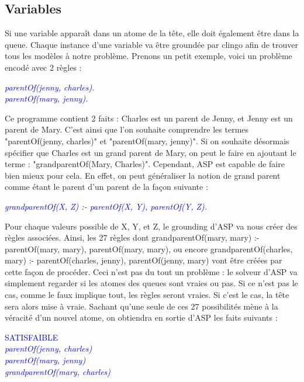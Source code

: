 \documentclass[12pt,a4paper]{article}
\begin{document}
\subsection{Variables}
Si une variable apparaît dans un atome de la tête, elle doit également être dans la queue. Chaque instance d'une variable va être groundée par clingo afin de trouver tous les modèles à notre problème.
Prenons un petit exemple, voici un problème encodé avec 2 règles :
\begin{center}
\emph{
	\textcolor{blue}{
  parentOf(jenny, charles).\\
  parentOf(mary, jenny).
	}
}
\end{center}
Ce programme contient 2 faits : Charles est un parent de Jenny, et Jenny est un parent de Mary. C'est ainsi que l'on souhaite comprendre les termes "parentOf(jenny, charles)" et "parentOf(mary, jenny)".
Si on souhaite désormais spécifier que Charles est un grand parent de Mary, on peut le faire en ajoutant le terme : "grandparentOf(Mary, Charles)". Cependant, ASP est capable de faire bien mieux pour cela.
En effet, on peut généraliser la notion de grand parent comme étant le parent d'un parent de la façon suivante :
\begin{center}
\emph{
	\textcolor{blue}{
  grandparentOf(X, Z) :- parentOf(X, Y), parentOf(Y, Z).
	}
}
\end{center}
Pour chaque valeurs possible de X, Y, et Z, le grounding d'ASP va nous créer des règles associées.
Ainsi, les 27 règles dont grandparentOf(mary, mary) :- parentOf(mary, mary), parentOf(mary, mary), ou encore grandparentOf(charles, mary) :- parentOf(charles, jenny), parentOf(jenny, mary) vont être créées 
par cette façon de procéder. Ceci n'est pas du tout un problème : le solveur d'ASP va simplement regarder si les atomes des queues sont vraies ou pas. Si ce n'est pas le cas, comme le faux implique tout, 
les règles seront vraies. Si c'est le cas, la tête sera alors mise à vraie. Sachant qu'une seule de ces 27 possibilités mène à la véracité d'un nouvel atome, on obtiendra en sortie d'ASP les faits suivants :
\begin{center}
\textcolor{blue}{
  SATISFAIBLE\\
	\emph{
  parentOf(jenny, charles)\\
  parentOf(mary, jenny)\\
  grandparentOf(mary, charles)
	}
}
\end{center}
\end{document}
